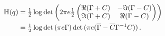 \documentclass[a4paper,10pt]{article}
\newcommand{\conj}[1]{\overline{#1}}
\begin{document}
\begin{align*} \label{eq:c-gauss-entropy-derivation}
  \mathbb{H}(q)
    &
    = \tfrac12 \log \det{\biggl(
      2 \pi e \tfrac12
      \begin{pmatrix}
        \Re{(\Gamma + C)} & - \Im{(\Gamma - C)} \\
        \Im{(\Gamma + C)} &   \Re{(\Gamma - C)}
      \end{pmatrix}
    \biggr)}
    \notag \\
    &
    = \tfrac12 \log \det{(\pi e \Gamma)} \det{(\pi e (\conj{\Gamma} - \conj{C} \Gamma^{-1} C))}
    \,.
\end{align*}
\end{document}
